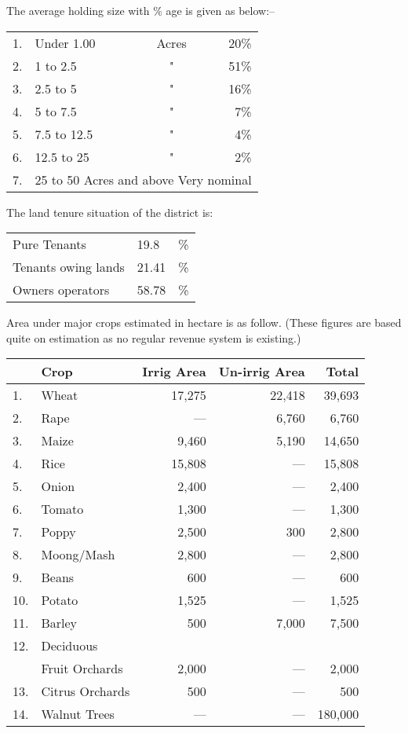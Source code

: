\documentclass[twoside,openright]{book}
\begin{document}
The average holding size with \% age is given as below:--

\begin{center}
\begin{tabular}{ l l c r }
1. & Under 1.00 & Acres & 20\% \\
2. & 1 to 2.5 & " & 51\% \\
3. & 2.5 to 5 & " & 16\% \\
4. & 5 to 7.5 & " & 7\% \\
5. & 7.5 to 12.5 & " & 4\% \\
6. & 12.5 to 25 & " & 2\% \\
7. & \multicolumn{3}{l}{25 to 50 Acres and above Very nominal} \\
\end{tabular}
\end{center}


The land tenure situation of the district is:


\begin{center}
\begin{tabular}{ l l l }
 Pure Tenants & 19.8 & \% \\
 Tenants owing lands & 21.41& \% \\
 Owners operators & 58.78 & \% \\
\end{tabular}
\end{center}

Area under major crops estimated in hectare is as follow. (These figures are
based quite on estimation as no regular revenue system is existing.)

\begin{center}
\begin{tabular}{ l l r r r }
\hline
 & Crop & Irrig Area & Un-irrig Area & Total \\
\hline
1. & Wheat & 17,275 & 22,418 & 39,693 \\
2. & Rape & --- & 6,760 & 6,760 \\
3. & Maize & 9,460 & 5,190 & 14,650 \\
4. & Rice & 15,808 & --- & 15,808 \\
5. & Onion & 2,400 & --- & 2,400 \\
6. & Tomato & 1,300 & --- & 1,300 \\
7. & Poppy & 2,500 & 300 & 2,800 \\
8. & Moong/Mash & 2,800 & --- & 2,800 \\
9. & Beans & 600 & --- & 600 \\
10. & Potato & 1,525 & --- & 1,525 \\
11. & Barley & 500 & 7,000 & 7,500 \\
12. & Deciduous & & & \\
 & Fruit Orchards & 2,000 & --- & 2,000 \\
13. & Citrus Orchards & 500 & --- & 500 \\
14. & Walnut Trees & --- & --- & 180,000 \\
\hline
\end{tabular}
\end{center}
\end{document}
